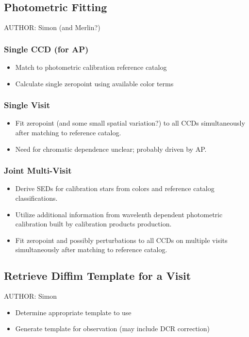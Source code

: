 \subsection{Photometric Fitting}
\label{sec:acPhotometricFitting}
AUTHOR: Simon (and Merlin?)
\subsubsection{Single CCD (for AP)}
\label{sec:acSingleCCDPhotometricFit}
\begin{itemize}
\item Match to photometric calibration reference catalog
\item Calculate single zeropoint using available color terms
\end{itemize}
\subsubsection{Single Visit}
\label{sec:acSingleVisitPhotometricFit}
\begin{itemize}
\item Fit zeropoint (and some small spatial variation?) to all CCDs simultaneously after matching to reference catalog.
\item Need for chromatic dependence unclear; probably driven by AP.
\end{itemize}
\subsubsection{Joint Multi-Visit}
\label{sec:acJointPhotometricFit}
\begin{itemize}
\item Derive SEDs for calibration stars from colors and reference catalog classifications.
\item Utilize additional information from wavelenth dependent photometric calibration built by calibration products production.
\item Fit zeropoint and possibly perturbations to all CCDs on multiple visits simultaneously after matching to reference catalog.
\end{itemize}

\subsection{Retrieve Diffim Template for a Visit}
\label{sec:acRetrieveTemplate}
AUTHOR: Simon
\begin{itemize}
\item Determine appropriate template to use
\item Generate template for observation (may include DCR correction)
\end{itemize}

